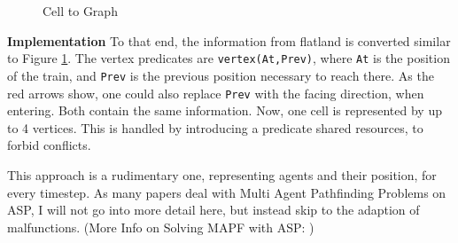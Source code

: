 \begin{figure}
\begin{minipage}[t]{0.45\textwidth}
    \centering
    \caption{Cell to Graph}
    \label{fig:graph}
\end{minipage}
\end{figure}

\noindent \textbf{Implementation} To that end, the information from flatland is converted similar to Figure \ref{fig:graph}. The vertex predicates are \texttt{vertex(At,Prev)}, where \texttt{At} is the position of the train, and \texttt{Prev} is the previous position necessary to reach there. As the red arrows show, one could also replace \texttt{Prev} with the facing direction, when entering. Both contain the same information. Now, one cell is represented by up to 4 vertices. This is handled by introducing a predicate shared resources, to forbid conflicts.

This approach is a rudimentary one, representing agents and their position, for every timestep. As many papers deal with Multi Agent Pathfinding Problems on ASP, I will not go into more detail here, but instead skip to the adaption of malfunctions. (More Info on Solving MAPF with ASP: \cite{MAPF})\\

